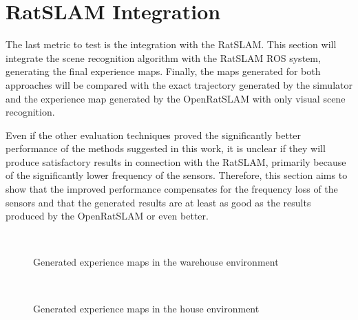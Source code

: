 \section{RatSLAM Integration}\label{section:RatSalmIntegration}

The last metric to test is the integration with the RatSLAM. This section will integrate the scene recognition algorithm with the RatSLAM ROS system, generating the final experience maps. Finally, the maps generated for both approaches will be compared with the exact trajectory generated by the simulator and the experience map generated by the OpenRatSLAM with only visual scene recognition.\par
Even if the other evaluation techniques proved the significantly better performance of the methods suggested in this work, it is unclear if they will produce satisfactory results in connection with the RatSLAM, primarily because of the significantly lower frequency of the sensors. Therefore, this section aims to show that the improved performance compensates for the frequency loss of the sensors and that the generated results are at least as good as the results produced by the OpenRatSLAM or even better.\par

\begin{figure}[!tbp]
    \centering
    \hfill
    \\
    \hfill
    \caption{Generated experience maps in the warehouse environment}
    \label{fig:mapsWarehouse}
\end{figure}

\begin{figure}[!tbp]
    \centering
    \hfill
    \\
    \hfill
    \caption{Generated experience maps in the house environment}
    \label{fig:mapsHouse}
\end{figure}

